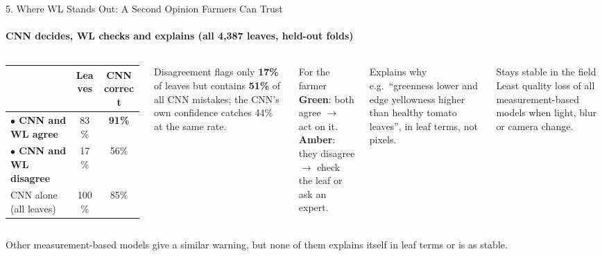 \documentclass[aspectratio=169, 11pt]{beamer}
\begin{document}
\begin{frame}{5. Where WL Stands Out: A Second Opinion Farmers Can Trust}
    \framesubtitle{CNN decides, WL checks and explains (all 4,387 leaves, held-out folds)}
    \begin{columns}[T]
        \small
        \renewcommand{\arraystretch}{1.12}
        \begin{tabular}{@{}l c c@{}}
            \toprule
            & \textbf{Leaves} & \textbf{CNN correct} \\
            \midrule
            \textcolor{green!50!black}{\textbf{$\bullet$ CNN and WL agree}} & 83\% & \textbf{91\%} \\
            \textcolor{orange!90!black}{\textbf{$\bullet$ CNN and WL disagree}} & 17\% & 56\% \\
            \midrule
            CNN alone (all leaves) & 100\% & 85\% \\
            \bottomrule
        \end{tabular}

        \vspace{0.25cm}
        {\footnotesize Disagreement flags only \textbf{17\%} of leaves but contains \textbf{51\%} of all CNN mistakes;
        the CNN's own confidence catches 44\% at the same rate.}

        \begin{block}{For the farmer}
            \scriptsize \textcolor{green!50!black}{\textbf{Green}}: both agree $\rightarrow$ act on it.\\
            \textcolor{orange!90!black}{\textbf{Amber}}: they disagree $\rightarrow$ check the leaf or ask an expert.
        \end{block}
        \begin{block}{Explains why}
            \scriptsize e.g.\ ``greenness lower and edge yellowness higher than healthy tomato leaves'', in leaf terms, not pixels.
        \end{block}
        \begin{block}{Stays stable in the field}
            \scriptsize Least quality loss of all measurement-based models when light, blur or camera change.
        \end{block}
    \end{columns}
    \vspace{0.1cm}
    \centering
    {\scriptsize Other measurement-based models give a similar warning, but none of them explains itself in leaf terms or is as stable.}
\end{frame}
\end{document}
